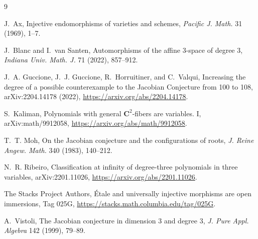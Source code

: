 \documentclass[11pt]{article}
\newcommand{\C}{\mathbf C}
\begin{document}
\begin{thebibliography}{9}

J.~Ax,
\newblock Injective endomorphisms of varieties and schemes,
\newblock \emph{Pacific J. Math.} 31 (1969), 1--7.

J.~Blanc and I.~van Santen,
\newblock Automorphisms of the affine 3-space of degree 3,
\newblock \emph{Indiana Univ. Math. J.} 71 (2022), 857--912.

J.~A. Guccione, J.~J. Guccione, R.~Horruitiner, and C.~Valqui,
\newblock Increasing the degree of a possible counterexample to the
Jacobian Conjecture from 100 to 108,
\newblock arXiv:2204.14178 (2022),
\newblock \url{https://arxiv.org/abs/2204.14178}.

S.~Kaliman,
\newblock Polynomials with general \(\C^2\)-fibers are variables. I,
\newblock arXiv:math/9912058,
\newblock \url{https://arxiv.org/abs/math/9912058}.

T.~T. Moh,
\newblock On the Jacobian conjecture and the configurations of roots,
\newblock \emph{J. Reine Angew. Math.} 340 (1983), 140--212.

N.~R. Ribeiro,
\newblock Classification at infinity of degree-three polynomials in
three variables,
\newblock arXiv:2201.11026,
\newblock \url{https://arxiv.org/abs/2201.11026}.

The Stacks Project Authors,
\newblock Étale and universally injective morphisms are open immersions,
\newblock Tag 025G,
\newblock \url{https://stacks.math.columbia.edu/tag/025G}.

A.~Vistoli,
\newblock The Jacobian conjecture in dimension 3 and degree 3,
\newblock \emph{J. Pure Appl. Algebra} 142 (1999), 79--89.

\end{thebibliography}
\end{document}
